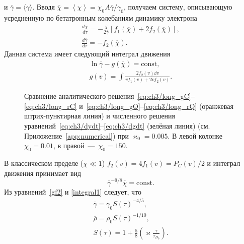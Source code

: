 и $\overline{\gamma} = \langle\gamma\rangle$.
Вводя $\overline{\chi}=\left\langle \chi\right\rangle = \chi_0 A \overline{\gamma} / \gamma_0$, получаем систему, описывающую усредненную по бетатронным колебаниям динамику электрона
\begin{gather}
    \label{v}
    \frac{d\overline{\chi}}{d\tau} = -\frac{\overline{\chi}}{2\overline{\gamma}}\left[f_{1}\left(\overline{\chi}\right)+2f_{2}\left(\overline{\chi} \right)\right],\\
    \label{gf2}
    \frac{d\overline{\gamma}}{d\tau} = -f_{2}\left(\overline{\chi } \right).
\end{gather}
Данная система имеет следующий интеграл движения
\begin{gather}
    \ln \overline{\gamma} - g (\overline{\chi} )  = \mathrm{const} \label{integral} , \\
    g (v) = \int \frac{2f_{2}(v)\dd v} {v f_{1}\left(v \right)+2 v f_{2}\left(v \right)}.
\end{gather}
\begin{figure}[ht]
	\caption[Сравнение аналитического и численного решений уравнений движения частиц при столкновении длинных пучков в режиме слабого пучкового излучения]{\label{fig:ch3/sec3/long} 
    Сравнение аналитического решения~\eqref{eq:ch3/long_gC}--\eqref{eq:ch3/long_rC} и~\eqref{eq:ch3/long_gQ}--\eqref{eq:ch3/long_rQ} (оранжевая штрих-пунктирная линия) и численного решения уравнений~\eqref{eq:ch3/dydt}--\eqref{eq:ch3/dgdt} (зелёная линия) (см. Приложение~\ref{app:numerical}) при $\varkappa_0=0.005$. В левой колонке $\chi_0=0.01$, в правой~---~$\chi_0=150$.}
	\label{long}
\end{figure}
В классическом пределе ($\chi \ll 1$) $f_{2}(v) = 4 f_{1}(v)=P_C(v)/2$ и интеграл движения принимает вид
\begin{equation}
    \overline{\gamma}^{-9/8} \overline{\chi} = \text{const}.\label{integral1}
\end{equation}
Из уравнений~\eqref{gf2} и \eqref{integral1} следует, что
\begin{gather}
    \label{eq:ch3/long_gC}
    \overline{\gamma} = \gamma_{0} S(\tau)^{-4/5} ,\\
    \label{eq:ch3/long_rC}
    \overline \rho = \rho_{0} S(\tau)^{-1/10},\\
    S(\tau) = 1+\frac{5}{8}\left( \varkappa\frac{\tau}{\tau_{D_0}} \right).
\end{gather}

